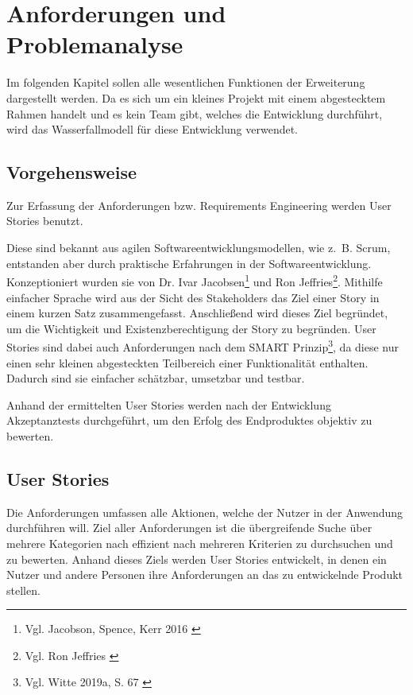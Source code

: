 \chapter{Anforderungen und Problemanalyse}
\label{ch:anforderungen}

Im folgenden Kapitel sollen alle wesentlichen Funktionen der Erweiterung dargestellt werden. Da es sich um ein kleines Projekt mit einem abgestecktem Rahmen handelt und es kein Team gibt, welches die Entwicklung durchführt, wird das Wasserfallmodell für diese Entwicklung verwendet.


\section{Vorgehensweise}

Zur Erfassung der Anforderungen bzw. Requirements Engineering werden User Stories benutzt.

Diese sind bekannt aus agilen Softwareentwicklungsmodellen, wie z. B. Scrum, entstanden aber durch praktische Erfahrungen in der Softwareentwicklung.
Konzeptioniert wurden sie von Dr. Ivar Jacobsen\footnote{Vgl. Jacobson, Spence, Kerr 2016 \cite{jacobson2016}} und Ron Jeffries\footnote{Vgl. Ron Jeffries \cite{jeffries2022}}.
Mithilfe einfacher Sprache wird aus der Sicht des Stakeholders das Ziel einer Story in einem kurzen Satz zusammengefasst.
Anschließend wird dieses Ziel begründet, um die Wichtigkeit und Existenzberechtigung der Story zu begründen.
User Stories sind dabei auch Anforderungen nach dem SMART Prinzip\footnote{Vgl. Witte 2019a, S. 67 \cite{witte2016}}, da diese nur einen sehr kleinen abgesteckten Teilbereich einer Funktionalität enthalten.
Dadurch sind sie einfacher schätzbar, umsetzbar und testbar.

Anhand der ermittelten User Stories werden nach der Entwicklung Akzeptanztests durchgeführt, um den Erfolg des Endproduktes objektiv zu bewerten.

\section{User Stories}

Die Anforderungen umfassen alle Aktionen, welche der Nutzer in der Anwendung durchführen will.
Ziel aller Anforderungen ist die übergreifende Suche über mehrere Kategorien nach effizient nach mehreren Kriterien zu durchsuchen und zu bewerten.
Anhand dieses Ziels werden User Stories entwickelt, in denen ein Nutzer und andere Personen ihre Anforderungen an das zu entwickelnde Produkt stellen.

